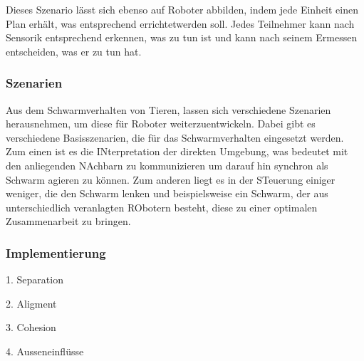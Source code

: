 \noindent
Dieses Szenario lässt sich ebenso auf Roboter abbilden, indem jede Einheit einen Plan erhält, was entsprechend errichtetwerden soll. Jedes Teilnehmer kann nach Sensorik entsprechend erkennen, was zu tun ist und kann nach seinem Ermessen entscheiden, was er zu tun hat.

\newpage
\subsubsection{Szenarien}

Aus dem Schwarmverhalten von Tieren, lassen sich verschiedene Szenarien herausnehmen, um diese für Roboter weiterzuentwickeln. Dabei gibt es verschiedene Basisszenarien, die für das Schwarmverhalten eingesetzt werden. Zum einen ist es die INterpretation der direkten Umgebung, was bedeutet mit den anliegenden NAchbarn zu kommunizieren um darauf hin synchron als Schwarm agieren zu können. Zum anderen liegt es in der STeuerung einiger weniger, die den Schwarm lenken und beispielsweise ein Schwarm, der aus unterschiedlich veranlagten RObotern besteht, diese zu einer optimalen Zusammenarbeit zu bringen.

\subsubsection{Implementierung}


1. Separation

2. Aligment

3. Cohesion

4. Ausseneinflüsse
